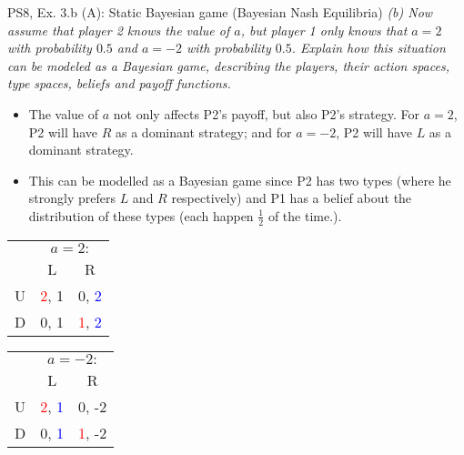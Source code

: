 \begin{frame}{PS8, Ex. 3.b (A): Static Bayesian game (Bayesian Nash Equilibria)}
    \textit{(b) Now assume that player 2 knows the value of $a$, but player 1 only knows that $a=2$ with probability $0.5$ and $a=-2$ with probability $0.5$. Explain how this situation can be modeled as a Bayesian game, describing the players, their action spaces, type spaces, beliefs and payoff functions.}
    \vspace{-8pt}
    \begin{multicols}{2}
      \begin{itemize}
      \item[(a)] The value of $a$ not only affects P2's payoff, but also P2's strategy. For $a=2$, P2 will have $R$ as a dominant strategy; and for $a=-2$, P2 will have $L$ as a dominant strategy.
      \item[(b)] This can be modelled as a Bayesian game since P2 has two types (where he strongly prefers $L$ and $R$ respectively) and P1 has a belief about the distribution of these types (each happen $\frac{1}{2}$ of the time.).
      \end{itemize}
      \vfill\null\columnbreak
      \begin{table}
          \begin{tabular}{l|c|c|}
          \multicolumn{1}{c}{} & \multicolumn{2}{c}{$a=2:$} \\
          \multicolumn{1}{c}{} & \multicolumn{1}{c}{L} & \multicolumn{1}{c}{\color{blue}R} \\\cline{2-3}
          U & \textcolor{red}{2}, 1 & 0, \textcolor{blue}{2} \\\cline{2-3}
          D & 0, 1 & \textcolor{red}{1}, \textcolor{blue}{2} \\\cline{2-3}
        \end{tabular}
      \end{table}
      \vspace{-8pt}
      \begin{table}
        \begin{tabular}{l|c|c|}
          \multicolumn{1}{c}{} & \multicolumn{2}{c}{$a=-2:$} \\
          \multicolumn{1}{c}{} & \multicolumn{1}{c}{\color{blue}L} & \multicolumn{1}{c}{R} \\\cline{2-3}
          U & \textcolor{red}{2}, \textcolor{blue}{1} & 0, -2 \\\cline{2-3}
          D & 0, \textcolor{blue}{1} & \textcolor{red}{1}, -2 \\\cline{2-3}
        \end{tabular}
      \end{table}
      \vfill\null
    \end{multicols}
\end{frame}
